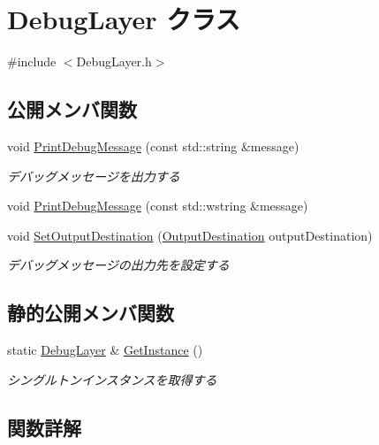 \hypertarget{class_debug_layer}{}\section{Debug\+Layer クラス}
\label{class_debug_layer}


{\ttfamily \#include $<$Debug\+Layer.\+h$>$}

\subsection*{公開メンバ関数}
\begin{DoxyCompactItemize}
\item 
void \mbox{\hyperlink{class_debug_layer_ae7d923632d5bcb7144a353a058d8c399}{Print\+Debug\+Message}} (const std\+::string \&message)
\begin{DoxyCompactList}\small\item\em デバッグメッセージを出力する \end{DoxyCompactList}\item 
void \mbox{\hyperlink{class_debug_layer_a44dbc3cf9a953753fb1ebcc1e1452ec2}{Print\+Debug\+Message}} (const std\+::wstring \&message)
\item 
void \mbox{\hyperlink{class_debug_layer_a8f3febbe9d2b0a3fcfeb4318516ec534}{Set\+Output\+Destination}} (\mbox{\hyperlink{_debug_layer_8h_a30a5879c4955b5fe9920db6bab79f721}{Output\+Destination}} output\+Destination)
\begin{DoxyCompactList}\small\item\em デバッグメッセージの出力先を設定する \end{DoxyCompactList}\end{DoxyCompactItemize}
\subsection*{静的公開メンバ関数}
\begin{DoxyCompactItemize}
\item 
static \mbox{\hyperlink{class_debug_layer}{Debug\+Layer}} \& \mbox{\hyperlink{class_debug_layer_a49a25b68bbb3dba02c94ecb6e28a49fd}{Get\+Instance}} ()
\begin{DoxyCompactList}\small\item\em シングルトンインスタンスを取得する \end{DoxyCompactList}\end{DoxyCompactItemize}


\subsection{関数詳解}
\mbox{\label{class_debug_layer_a49a25b68bbb3dba02c94ecb6e28a49fd}} 

